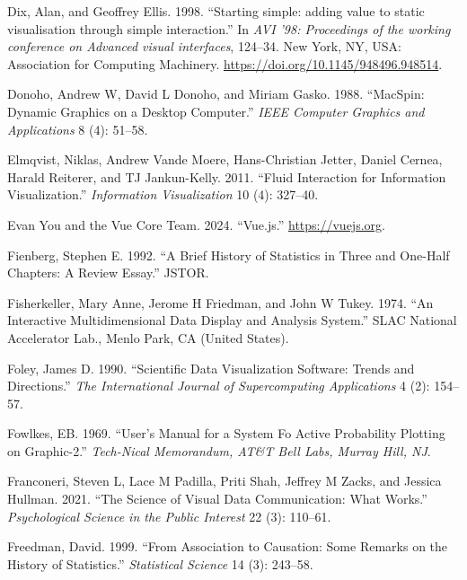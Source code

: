\documentclass[
]{book}
\newlength{\cslhangindent}
\newenvironment{CSLReferences}[2] %
 {\begin{list}{}{%
  \setlength{\itemindent}{0pt}
  \setlength{\leftmargin}{0pt}
  \setlength{\parsep}{0pt}
  \ifodd #1
   \setlength{\leftmargin}{\cslhangindent}
   \setlength{\itemindent}{-1\cslhangindent}
  \fi
  \setlength{\itemsep}{#2\baselineskip}}}
 {\end{list}}
\begin{document}
\begin{CSLReferences}{1}{0}
Dix, Alan, and Geoffrey Ellis. 1998. {``{Starting simple: adding value to static visualisation through simple interaction}.''} In \emph{{AVI '98: Proceedings of the working conference on Advanced visual interfaces}}, 124--34. New York, NY, USA: Association for Computing Machinery. \url{https://doi.org/10.1145/948496.948514}.

Donoho, Andrew W, David L Donoho, and Miriam Gasko. 1988. {``MacSpin: Dynamic Graphics on a Desktop Computer.''} \emph{IEEE Computer Graphics and Applications} 8 (4): 51--58.

Elmqvist, Niklas, Andrew Vande Moere, Hans-Christian Jetter, Daniel Cernea, Harald Reiterer, and TJ Jankun-Kelly. 2011. {``Fluid Interaction for Information Visualization.''} \emph{Information Visualization} 10 (4): 327--40.

Evan You and the Vue Core Team. 2024. {``Vue.js.''} \url{https://vuejs.org}.

Fienberg, Stephen E. 1992. {``A Brief History of Statistics in Three and One-Half Chapters: A Review Essay.''} JSTOR.

Fisherkeller, Mary Anne, Jerome H Friedman, and John W Tukey. 1974. {``An Interactive Multidimensional Data Display and Analysis System.''} SLAC National Accelerator Lab., Menlo Park, CA (United States).

Foley, James D. 1990. {``Scientific Data Visualization Software: Trends and Directions.''} \emph{The International Journal of Supercomputing Applications} 4 (2): 154--57.

Fowlkes, EB. 1969. {``User's Manual for a System Fo Active Probability Plotting on Graphic-2.''} \emph{Tech-Nical Memorandum, AT\&T Bell Labs, Murray Hill, NJ}.

Franconeri, Steven L, Lace M Padilla, Priti Shah, Jeffrey M Zacks, and Jessica Hullman. 2021. {``The Science of Visual Data Communication: What Works.''} \emph{Psychological Science in the Public Interest} 22 (3): 110--61.

Freedman, David. 1999. {``From Association to Causation: Some Remarks on the History of Statistics.''} \emph{Statistical Science} 14 (3): 243--58.


\end{CSLReferences}
\end{document}
